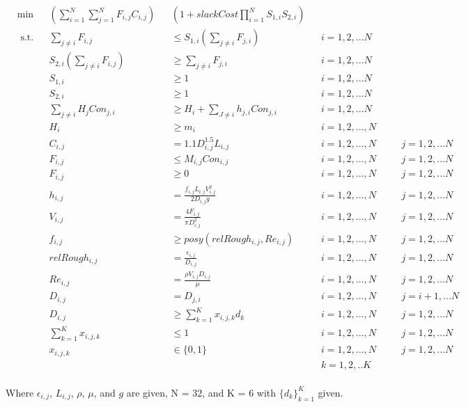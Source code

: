 \documentclass[12pt]{article}
\begin{document}
	\begin{equation}
	\begin{aligned}
	&\min &&(\sum_{i=1}^{N}\sum_{j=1}^{N} F_{i,j} C_{i,j})&&(1 + slackCost \prod_{i=1}^{N}S_{1,i}S_{2,i})\\
	& \text{ s.t.} && \sum_{j \neq i} F_{i,j} && \leq S_{1,i}(\sum_{j \neq i} F_{j,i}) \quad && i = 1, 2, ... N\\
	& && S_{2,i}(\sum_{j \neq i} F_{i,j}) && \geq \sum_{j \neq i} F_{j,i} \quad && i = 1, 2, ... N\\
	& && S_{1,i} && \geq 1 \quad && i = 1, 2, ... N\\
	& && S_{2,i} && \geq 1 \quad && i = 1, 2, ... N\\
	& && \sum_{j \neq i} H_j Con_{j,i} && \geq H_i + \sum_{J \neq i} h_{j,i}Con_{j,i} && i = 1,2, ...N\\
	& && H_i && \geq m_i && i = 1, 2, ..., N \\
	& && C_{i,j} && = 1.1 D_{i,j}^{1.5} L_{i,j} && i = 1, 2, ..., N \quad && j = 1, 2, ... N\\
	& && F_{i,j} && \leq M_{i,j} Con_{i,j} && i = 1, 2, ..., N \quad && j = 1, 2, ... N\\
	& && F_{i,j} && \geq 0 && i = 1, 2, ..., N \quad && j = 1, 2, ... N\\
	& && h_{i,j} && = \frac{f_{i,j} L_{i,j} V_{i,j}^2}{2D_{i,j} g} && i = 1, 2, ..., N \quad && j = 1, 2, ... N\\
	& && V_{i,j} && = \frac{4 F_{i,j}}{\pi D_{i,j}^2} && i = 1, 2, ..., N \quad && j = 1, 2, ... N\\
	& && f_{i,j} &&\geq posy(relRough_{i,j}, Re_{i,j}) && i = 1, 2, ..., N \quad && j = 1, 2, ... N\\
	& && relRough_{i,j} && = \frac{\epsilon_{i,j}}{D_{i,j}} && i = 1, 2, ..., N \quad && j = 1, 2, ... N\\
	& && Re_{i,j} && = \frac{\rho V_{i,j} D_{i,j}}{\mu} && i = 1, 2, ..., N \quad && j = 1, 2, ... N\\
	& && D_{i,j} && = D_{j,i} && i = 1, 2, ..., N \quad && j = i+1, ... N\\
	& && D_{i,j} && \geq \sum_{k=1}^{K}x_{i,j,k}d_k && i = 1, 2, ..., N \quad && j = 1, 2, ... N\\
	& && \sum_{k=1}^{K} x_{i,j,k} && \leq 1 && i = 1, 2, ..., N \quad && j = 1, 2, ... N\\
	& && x_{i,j,k} && \in \{0,1\} && i = 1, 2, ..., N \quad && j = 1, 2, ... N \\
	& && && && k = 1,2, ..K\\ 
	\end{aligned}
	\end{equation}
	
	Where $\epsilon_{i,j}$, $L_{i,j}$, $\rho$, $\mu$, and $g$ are given, N = 32, and K = 6 with $\{d_k\}_{k=1}^{K}$ given. 
	
	
\end{document}
